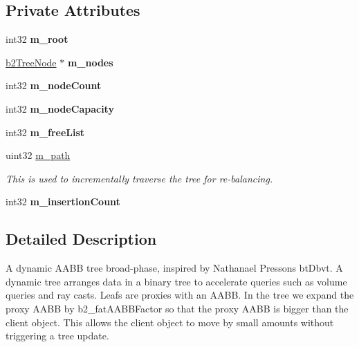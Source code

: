 \subsection*{Private Attributes}
\begin{DoxyCompactItemize}
\item 
int32 {\bfseries m\+\_\+root}\hypertarget{classb2_dynamic_tree_a336705eb2059313288e73de8da59b1a9}{}\label{classb2_dynamic_tree_a336705eb2059313288e73de8da59b1a9}

\item 
\hyperlink{structb2_tree_node}{b2\+Tree\+Node} $\ast$ {\bfseries m\+\_\+nodes}\hypertarget{classb2_dynamic_tree_a16ca7b850396a549eb494ed2f1eb5e5c}{}\label{classb2_dynamic_tree_a16ca7b850396a549eb494ed2f1eb5e5c}

\item 
int32 {\bfseries m\+\_\+node\+Count}\hypertarget{classb2_dynamic_tree_a7532c57eae4d8e04920dc8c9b14665af}{}\label{classb2_dynamic_tree_a7532c57eae4d8e04920dc8c9b14665af}

\item 
int32 {\bfseries m\+\_\+node\+Capacity}\hypertarget{classb2_dynamic_tree_a5b54249f52aee1de21b862ac060eccf2}{}\label{classb2_dynamic_tree_a5b54249f52aee1de21b862ac060eccf2}

\item 
int32 {\bfseries m\+\_\+free\+List}\hypertarget{classb2_dynamic_tree_abacc1866e2f5e5fb5e95d69592a4193a}{}\label{classb2_dynamic_tree_abacc1866e2f5e5fb5e95d69592a4193a}

\item 
uint32 \hyperlink{classb2_dynamic_tree_ab68ffe92575c26e5d3099d8ed050e188}{m\+\_\+path}\hypertarget{classb2_dynamic_tree_ab68ffe92575c26e5d3099d8ed050e188}{}\label{classb2_dynamic_tree_ab68ffe92575c26e5d3099d8ed050e188}

\begin{DoxyCompactList}\small\item\em This is used to incrementally traverse the tree for re-\/balancing. \end{DoxyCompactList}\item 
int32 {\bfseries m\+\_\+insertion\+Count}\hypertarget{classb2_dynamic_tree_a4657cf0c95a523da397094e5e6943f17}{}\label{classb2_dynamic_tree_a4657cf0c95a523da397094e5e6943f17}

\end{DoxyCompactItemize}


\subsection{Detailed Description}
A dynamic A\+A\+BB tree broad-\/phase, inspired by Nathanael Presson\textquotesingle{}s bt\+Dbvt. A dynamic tree arranges data in a binary tree to accelerate queries such as volume queries and ray casts. Leafs are proxies with an A\+A\+BB. In the tree we expand the proxy A\+A\+BB by b2\+\_\+fat\+A\+A\+B\+B\+Factor so that the proxy A\+A\+BB is bigger than the client object. This allows the client object to move by small amounts without triggering a tree update.

